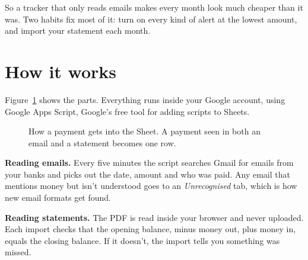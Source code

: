 \documentclass[10pt]{article}
\begin{document}
So a tracker that only reads emails makes every month look much cheaper than it was. Two habits fix most of it: turn on every kind of alert at the lowest amount, and import your statement each month.

\section{How it works}

Figure~\ref{fig:flow} shows the parts. Everything runs inside your Google account, using Google Apps Script, Google's free tool for adding scripts to Sheets.

\begin{figure}[H]
\centering
{}
\caption{How a payment gets into the Sheet. A payment seen in both an email and a statement becomes one row.}
\label{fig:flow}
\end{figure}

\textbf{Reading emails.} Every five minutes the script searches Gmail for emails from your banks and picks out the date, amount and who was paid. Any email that mentions money but isn't understood goes to an \emph{Unrecognised} tab, which is how new email formats get found.

\textbf{Reading statements.} The PDF is read inside your browser and never uploaded. Each import checks that the opening balance, minus money out, plus money in, equals the closing balance. If it doesn't, the import tells you something was missed.
\end{document}

